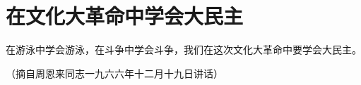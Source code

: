 \section[在文化大革命中学会大民主（一九六六年十二月）]{在文化大革命中学会大民主}


在游泳中学会游泳，在斗争中学会斗争，我们在这次文化大革命中要学会大民主。

{\raggedleft （摘自周恩来同志一九六六年十二月十九日讲话）\par}


